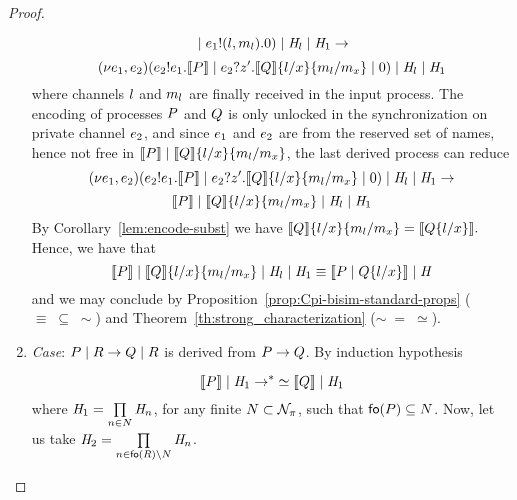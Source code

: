 \begin{proof}
\begin{enumerate}
\[\;|\; e_1!(l,m_l).0 ) \;|\; \mathit{H}_l \;|\; \mathit{H}_1 \rightarrow 
\]
\[ 
(\nu e_1,e_2) (e_2!e_1.  \llbracket  P  \rrbracket
\;|\; e_2?z'. \llbracket Q \rrbracket\{l/x\}\{m_l/m_x\} \;|\; 0) \;|\; \mathit{H}_l  \;|\; \mathit{H}_1 
\]
%
where channels $l$ and $m_l$  
are finally received in the input process. The encoding of  processes $P$ and $Q$ is only unlocked in the synchronization on private channel $e_2$, and since $e_1$ and $e_2$ are from the reserved set of names, hence not free in $\llbracket  P  \rrbracket\;|\;  \llbracket Q \rrbracket\{l/x\}\{m_l/m_x\}$, the last derived process can reduce
%
\[ 
(\nu e_1,e_2) (e_2!e_1.  \llbracket  P  \rrbracket
\;|\; e_2?z'. \llbracket Q \rrbracket\{l/x\}\{m_l/m_x\} \;|\; 0) \;|\; \mathit{H}_l  \;|\; \mathit{H}_1 \rightarrow
\]
\[  
 \llbracket  P  \rrbracket
\;|\;  \llbracket Q \rrbracket\{l/x\}\{m_l/m_x\}   \;|\; \mathit{H}_l  \;|\; \mathit{H}_1  
\]
%
By Corollary~\ref{lem:encode-subst} we have $
\llbracket Q \rrbracket\{l/x\}\{m_l/m_x\}=
\llbracket Q\{l/x\} \rrbracket.
$ 
Hence, we have that
\[
 \llbracket  P  \rrbracket
\;|\;  \llbracket Q \rrbracket\{l/x\}\{m_l/m_x\}   \;|\; \mathit{H}_l  \;|\; \mathit{H}_1 \equiv 
\llbracket P \;|\; Q\{l/x\} \rrbracket \;|\; \mathit{H}
\]
and we may conclude by Proposition~\ref{prop:Cpi-bisim-standard-props} ($\equiv\;\subseteq\; \sim$) and Theorem~\ref{th:strong_characterization} ($\sim\; = \; \simeq$).
%
%
\item \emph{Case}: $P \;|\; R \rightarrow Q \;|\; R$ is derived from $P\rightarrow Q$. 
By induction hypothesis  %
 
\[
\llbracket P \rrbracket\;|\; \mathit{H}_1 \rightarrow\negthickspace^* \simeq \llbracket Q \rrbracket\;|\; \mathit{H}_1
\]
where  
$\mathit{H}_1=\prod\limits_{n\in N} \mathit{H}_{n}$, for any finite $N\subset {\cal N}_\pi$, such that $\mathsf{fo}(P)\subseteq N$.
Now, 
let us take 
$\mathit{H}_2=\prod\limits_{n\in\mathsf{fo}(R)\setminus N} \mathit{H}_{n}$.


\end{enumerate}
\end{proof}
